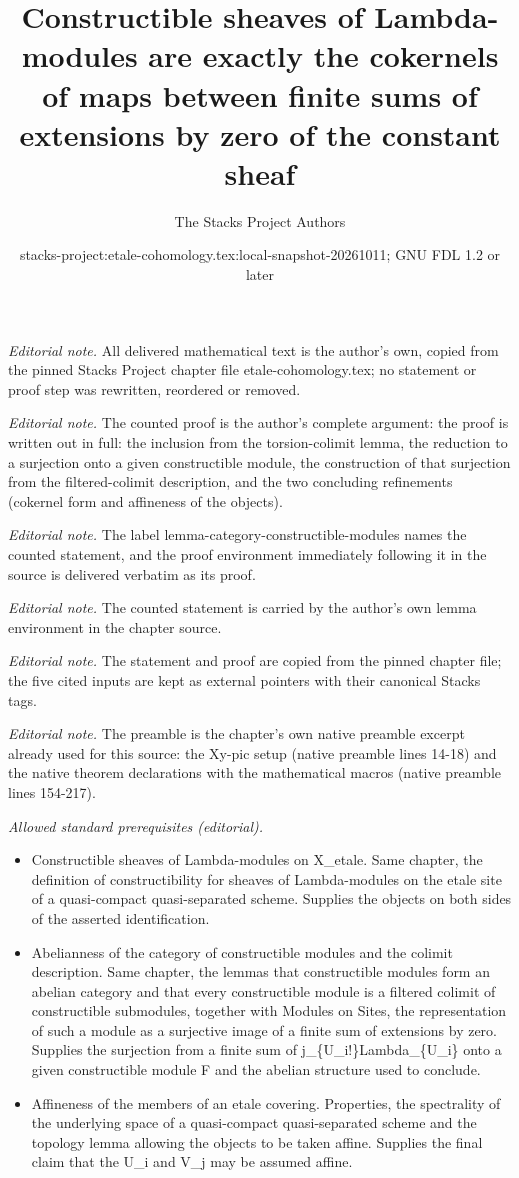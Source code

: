 \documentclass[10pt,a4paper]{amsart}
\title{Constructible sheaves of Lambda-modules are exactly the cokernels of maps between finite sums of extensions by zero of the constant sheaf}
\author{The Stacks Project Authors}
\date{stacks-project:etale-cohomology.tex:local-snapshot-20261011; GNU FDL 1.2 or later}
\theoremstyle{plain}
\theoremstyle{definition}
\theoremstyle{remark}
\numberwithin{equation}{subsection}
\begin{document}
\maketitle
\noindent\textit{Editorial note.} All delivered mathematical text is the author's own, copied from the pinned Stacks Project chapter file etale-cohomology.tex; no statement or proof step was rewritten, reordered or removed.\par\medskip
\noindent\textit{Editorial note.} The counted proof is the author's complete argument: the proof is written out in full: the inclusion from the torsion-colimit lemma, the reduction to a surjection onto a given constructible module, the construction of that surjection from the filtered-colimit description, and the two concluding refinements (cokernel form and affineness of the objects).\par\medskip
\noindent\textit{Editorial note.} The label lemma-category-constructible-modules names the counted statement, and the proof environment immediately following it in the source is delivered verbatim as its proof.\par\medskip
\noindent\textit{Editorial note.} The counted statement is carried by the author's own lemma environment in the chapter source.\par\medskip
\noindent\textit{Editorial note.} The statement and proof are copied from the pinned chapter file; the five cited inputs are kept as external pointers with their canonical Stacks tags.\par\medskip
\noindent\textit{Editorial note.} The preamble is the chapter's own native preamble excerpt already used for this source: the Xy-pic setup (native preamble lines 14-18) and the native theorem declarations with the mathematical macros (native preamble lines 154-217).\par\medskip
\noindent\textit{Allowed standard prerequisites (editorial).}\begin{itemize}
\item Constructible sheaves of Lambda-modules on X\_etale. Same chapter, the definition of constructibility for sheaves of Lambda-modules on the etale site of a quasi-compact quasi-separated scheme. Supplies the objects on both sides of the asserted identification.
\item Abelianness of the category of constructible modules and the colimit description. Same chapter, the lemmas that constructible modules form an abelian category and that every constructible module is a filtered colimit of constructible submodules, together with Modules on Sites, the representation of such a module as a surjective image of a finite sum of extensions by zero. Supplies the surjection from a finite sum of j\_\{U\_i!\}Lambda\_\{U\_i\} onto a given constructible module F and the abelian structure used to conclude.
\item Affineness of the members of an etale covering. Properties, the spectrality of the underlying space of a quasi-compact quasi-separated scheme and the topology lemma allowing the objects to be taken affine. Supplies the final claim that the U\_i and V\_j may be assumed affine.
\end{itemize}\medskip
\end{document}
